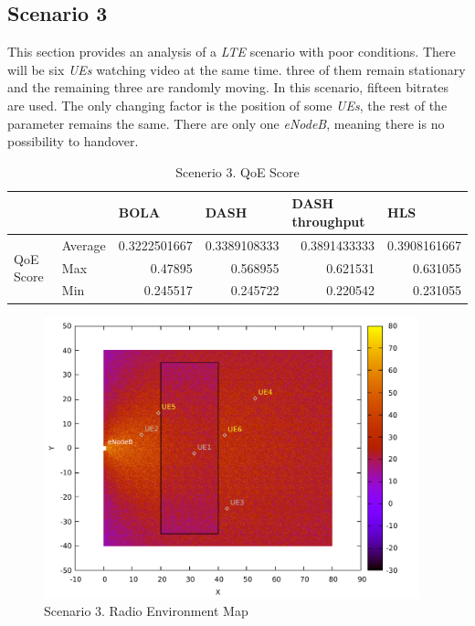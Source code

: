 \clearpage

\subsection{Scenario 3}


This section provides an analysis of a \textit{LTE} scenario with poor conditions. There will be six \textit{UEs} watching video at the same time.
three of them remain stationary and the remaining three are randomly moving.
In this scenario, fifteen bitrates are used.
The only changing factor is the position of some \textit{UEs}, 
the rest of the parameter remains the same. There are only one \textit{eNodeB}, meaning there 
is no possibility to handover.
\begin{table}[h]
  \begin{tabular}{@{}llrrrr@{}}
  \toprule
  &         & \multicolumn{1}{l}{BOLA} & \multicolumn{1}{l}{DASH} & \multicolumn{1}{l}{DASH throughput} & \multicolumn{1}{l}{HLS} \\ \midrule
  \multirow{3}{*}{QoE Score} & Average & 0.3222501667             & 0.3389108333             & 0.3891433333                        & 0.3908161667            \\
                             & Max     & 0.47895                  & 0.568955                 & 0.621531                            & 0.631055                \\
                             & Min     & 0.245517                 & 0.245722                 & 0.220542                            & 0.231055                \\ \bottomrule
  \end{tabular}
  \caption{Scenerio 3. QoE Score}
  \label{table:s3t1}
\end{table}

\begin{figure}[h]
  \centering
  \includegraphics[width=0.97\textwidth]{img/s3i1.pdf}
  \caption{Scenario 3. Radio Environment Map}
  \label{fig:s3i1}
\end{figure}


